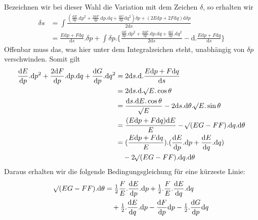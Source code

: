 %
Bezeichnen wir bei dieser Wahl die Variation mit dem Zeichen \(\delta\), so erhalten wir
\[
\begin{aligned}
\delta s&=\int\frac{(\tfrac{\mathrm{d}E}{\mathrm{d}p}\mathord{.}\mathrm{d}p^2+\tfrac{2\mathrm{d}F}{\mathrm{d}p}\mathord{.}\mathrm{d}p\mathord{.}\mathrm{d}q+\tfrac{\mathrm{d}G}{\mathrm{d}p}\mathrm{d}q^2)\delta p+(2E\mathrm{d}p+2F\mathrm{d}q)\mathrm{d}\delta p}{2\mathrm{d}s}\\
&=\frac{E\mathrm{d}p+F\mathrm{d}q}{\mathrm{d}s}\mathord{.}\delta p+\int\delta p\mathord{.}\{\frac{\tfrac{\mathrm{d}E}{\mathrm{d}p}\mathord{.}\mathrm{d}p^2+\tfrac{2\mathrm{d}F}{\mathrm{d}p}\mathord{.}\mathrm{d}p\mathord{.}\mathrm{d}q+\tfrac{\mathrm{d}G}{\mathrm{d}p}\mathord{.}\mathrm{d}q^2}{2\mathrm{d}s}-\mathrm{d}\mathord{.}\frac{E\mathrm{d}p+F\mathrm{d}q}{\mathrm{d}s}\}
\end{aligned}
\]
Offenbar muss das, was hier unter dem Integralzeichen steht, unabhängig von \(\delta p\) verschwinden. Somit gilt
\[
\begin{aligned}
\frac{\mathrm{d}E}{\mathrm{d}p}\mathord{.}\mathrm{d}p^2+\frac{2\mathrm{d}F}{\mathrm{d}p}\mathord{.}\mathrm{d}p\mathord{.}\mathrm{d}q+\frac{\mathrm{d}G}{\mathrm{d}p}\mathord{.}\mathrm{d}q^2&=2\mathrm{d}s\mathord{.}\mathrm{d}\mathord{.}\frac{E\mathrm{d}p+F\mathrm{d}q}{\mathrm{d}s}\\
&=2\mathrm{d}s\mathord{.}\mathrm{d}\mathord{.}\mathord{{}^{}\!\surd}E\mathord{.}\cos\theta\\
&=\frac{\mathrm{d}s\mathord{.}\mathrm{d}E\mathord{.}\cos\theta}{\mathord{{}^{}\!\surd}E}-2\mathrm{d}s\mathord{.}\mathrm{d}\theta\mathord{.}\mathord{{}^{}\!\surd}E\mathord{.}\sin\theta\\
&=\frac{(E\mathrm{d}p+F\mathrm{d}q)\mathrm{d}E}{E}-\mathord{{}^{}\!\surd}(EG-FF)\mathord{.}\mathrm{d}q\mathord{.}\mathrm{d}\theta\\
&=(\frac{E\mathrm{d}p+F\mathrm{d}q}{E})\mathord{.}(\frac{\mathrm{d}E}{\mathrm{d}p}\mathord{.}\mathrm{d}p+\frac{\mathrm{d}E}{\mathrm{d}q}\mathord{.}\mathrm{d}q)\\
&\quad-2\mathord{{}^{}\!\surd}(EG-FF)\mathord{.}\mathrm{d}q\mathord{.}\mathrm{d}\theta
\end{aligned}
\]
Daraus erhalten wir die folgende Bedingungsgleichung für eine kürzeste Linie:
\[
\begin{aligned}
\mathord{{}^{}\!\surd}(EG-FF)\mathord{.}\mathrm{d}\theta
&=\tfrac{1}{2}\frac{F}{E}\mathord{.}\frac{\mathrm{d}E}{\mathrm{d}p}\mathord{.}\mathrm{d}p+\tfrac{1}{2}\mathord{.}\frac{F}{E}\mathord{.}\frac{\mathrm{d}E}{\mathrm{d}q}\mathord{.}\mathrm{d}q\\
&\quad+\tfrac{1}{2}\mathord{.}\frac{\mathrm{d}E}{\mathrm{d}q}\mathord{.}\mathrm{d}p-\frac{\mathrm{d}F}{\mathrm{d}p}\mathrm{d}p-\tfrac{1}{2}\mathord{.}\frac{\mathrm{d}G}{\mathrm{d}p}\mathrm{d}q
\end{aligned}
\]
